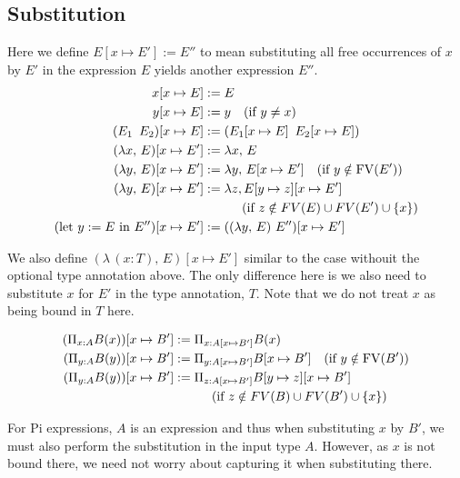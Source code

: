 \documentclass{article}
\begin{document}
\subsection{Substitution}
Here we define $E [x \mapsto E'] := E''$ to mean substituting all free
occurrences of $x$ by $E'$ in the expression $E$ yields another expression $E''$.
\begin{align*}
  x[x \mapsto E] &:= E \\
  y[x \mapsto E] &:= y \quad (\text{if } y \ne x) \\
  (E_1 \,\,\, E_2) [x \mapsto E] &:= (E_1 [x \mapsto E] \,\,\, E_2 [x \mapsto E]) \\
  (\lambda x, \, E) [x \mapsto E'] &:= \lambda x, \, E \\ 
  (\lambda y, \, E) [x \mapsto E'] &:= \lambda y, \, E[x \mapsto E'] \quad (\text{if } y \notin \operatorname{FV}(E')) \\ 
  (\lambda y, \, E) [x \mapsto E'] &:= \lambda z, E[y \mapsto z][x \mapsto E'] \\
                 &\quad \quad \quad (\text{if } z \notin FV(E) \cup FV(E') \cup \{x\}) \\
  (\text{let } y := E \text{ in } E'') [x \mapsto E'] &:= 
    ((\lambda y, \, E) \,\, E'') [x \mapsto E']
\end{align*}

We also define $(\lambda \, (x : T), \, E) [x \mapsto E']$
similar to the case withouit the optional type annotation above. The only
difference here is we also need to substitute $x$ for $E'$ in the type annotation,
$T$. Note that we do not treat $x$ as being bound in $T$ here.

\begin{align*}
  (\Pi_{x : A} B(x)) [x \mapsto B'] &:= \Pi_{x : A[x \mapsto B']} B(x) \\ 
  (\Pi_{y : A} B(y)) [x \mapsto B'] &:= \Pi_{y : A[x \mapsto B']} B[x \mapsto B'] \quad (\text{if } y \notin \operatorname{FV}(B')) \\ 
  (\Pi_{y : A} B(y)) [x \mapsto B'] &:= \Pi_{z : A[x \mapsto B']} B[y \mapsto z][x \mapsto B'] \\
                 &\quad \quad \quad (\text{if } z \notin FV(B) \cup FV(B') \cup \{x\})
\end{align*}

For Pi expressions, $A$ is an expression and thus when substituting $x$ by
$B'$, we must also perform the substitution in the input type $A$. However, as
$x$ is not bound there, we need not worry about capturing it when substituting there. 
\end{document}
